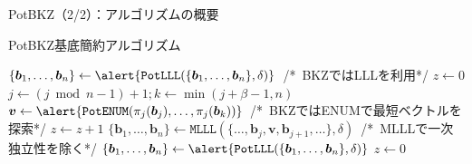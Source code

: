 \documentclass[12pt,aspectratio=169,xcolor=dvipsnames,table,dvipdfmx, leqno]{beamer}
\begin{document}
\begin{frame}[fragile]{PotBKZ（2/2）：アルゴリズムの概要}
\begin{algorithm}[H]
    \footnotesize
    \begin{algorithmic}[1]
        \caption{\footnotesize PotBKZ基底簡約アルゴリズム}
        \State $\{\bm{b}_1,\ldots,\bm{b}_n\}\gets \alert{\texttt{PotLLL}(\{\bm{b}_1,\ldots,\bm{b}_n\}, \delta)}$~/*~BKZ\cite{SE94}ではLLL\cite{LLL82}を利用*/
        \State $z \gets 0$
            \State $j \gets (j \bmod{n-1}) + 1; k \gets \min(j + \beta-1, n)$
            \State $\bm{v}\gets \alert{\texttt{PotENUM}(\pi_j(\bm{b}_j), \dots, \pi_j(\bm{b}_k))}$~/*~BKZではENUM\cite{GNR10}で最短ベクトルを探索*/
                \State $z\gets z+1$
            \Else
                \State $\{\bm{b}_1,\ldots,\bm{b}_n\}\gets \texttt{MLLL}(\{\ldots,\bm{b}_j, \bm{v},\bm{b}_{j+1},\ldots\}, \delta)$~/*~MLLL\cite{SE94}で一次独立性を除く*/
                \State $\{\bm{b}_1,\ldots,\bm{b}_n\}\gets \alert{\texttt{PotLLL}(\{\bm{b}_1,\ldots,\bm{b}_n\}, \delta)}$
                \State $z\gets 0$
            \EndIf
        \EndWhile
    \end{algorithmic}
\end{algorithm}
\end{frame}
\end{document}
